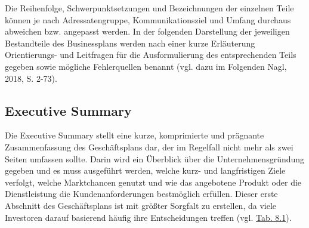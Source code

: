 \documentclass[
  letterpaper,
]{book}
\begin{document}
Die Reihenfolge, Schwerpunktsetzungen und Bezeichnungen der einzelnen
Teile können je nach Adressatengruppe, Kommunikationsziel und Umfang
durchaus abweichen bzw. angepasst werden. In der folgenden Darstellung
der jeweiligen Bestandteile des Businessplans werden nach einer kurze
Erläuterung Orientierungs- und Leitfragen für die Ausformulierung des
entsprechenden Teils gegeben sowie mögliche Fehlerquellen benannt (vgl.
dazu im Folgenden Nagl, 2018, S. 2-73).

\subsection{Executive Summary}\label{executive-summary}

Die Executive Summary stellt eine kurze, komprimierte und prägnante
Zusammenfassung des Geschäftsplans dar, der im Regelfall nicht mehr als
zwei Seiten umfassen sollte. Darin wird ein Überblick über die
Unternehmensgründung gegeben und es muss ausgeführt werden, welche kurz-
und langfristigen Ziele verfolgt, welche Marktchancen genutzt und wie
das angebotene Produkt oder die Dienstleistung die Kundenanforderungen
bestmöglich erfüllen. Dieser erste Abschnitt des Geschäftsplans ist mit
größter Sorgfalt zu erstellen, da viele Investoren darauf basierend
häufig ihre Entscheidungen treffen (vgl. \hyperref[table81]{Tab. 8.1}).
\end{document}
